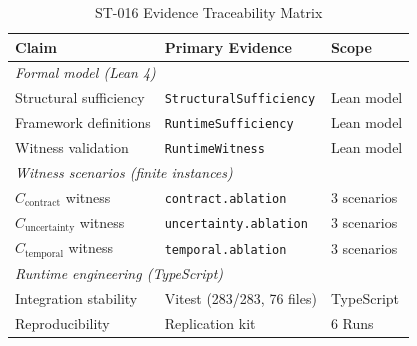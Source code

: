 \begin{table}[htbp]
\caption{ST-016 Evidence Traceability Matrix}
\label{tab:evidence}
\centering\small
\begin{tabular}{p{3.0cm}p{3.2cm}p{2.0cm}}
\toprule
\textbf{Claim} & \textbf{Primary Evidence} & \textbf{Scope} \\
\midrule
\multicolumn{3}{l}{\textit{Formal model (Lean 4)}} \\
Structural sufficiency       & \texttt{StructuralSufficiency} & Lean model \\
Framework definitions        & \texttt{RuntimeSufficiency}    & Lean model \\
Witness validation           & \texttt{RuntimeWitness}        & Lean model \\
\midrule
\multicolumn{3}{l}{\textit{Witness scenarios (finite instances)}} \\
$C_{\text{contract}}$ witness    & \texttt{contract.ablation}     & 3 scenarios \\
$C_{\text{uncertainty}}$ witness & \texttt{uncertainty.ablation}  & 3 scenarios \\
$C_{\text{temporal}}$ witness    & \texttt{temporal.ablation}     & 3 scenarios \\
\midrule
\multicolumn{3}{l}{\textit{Runtime engineering (TypeScript)}} \\
Integration stability        & Vitest (283/283, 76 files)     & TypeScript  \\
Reproducibility~\cite{takt_st016_2026} & Replication kit       & 6 Runs      \\
\bottomrule
\end{tabular}
\end{table}
